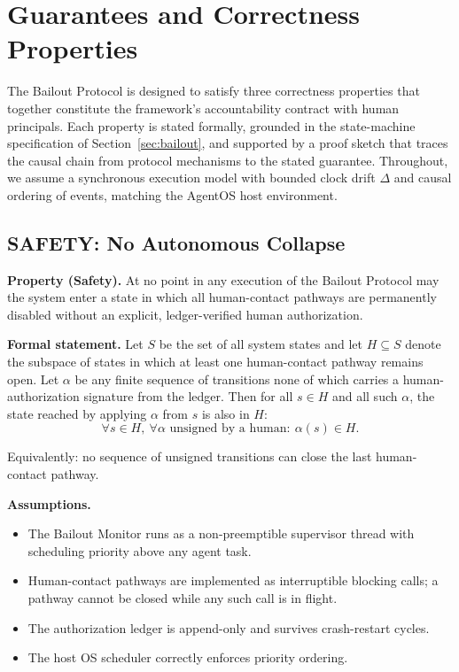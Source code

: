 \section{Guarantees and Correctness Properties}\label{sec:properties}

The Bailout Protocol is designed to satisfy three correctness properties that together constitute the framework's accountability contract with human principals. Each property is stated formally, grounded in the state-machine specification of Section~\ref{sec:bailout}, and supported by a proof sketch that traces the causal chain from protocol mechanisms to the stated guarantee. Throughout, we assume a synchronous execution model with bounded clock drift $\Delta$ and causal ordering of events, matching the AgentOS host environment.

\subsection{SAFETY: No Autonomous Collapse}\label{sec:safety}

\textbf{Property (Safety).} At no point in any execution of the Bailout Protocol may the system enter a state in which all human-contact pathways are permanently disabled without an explicit, ledger-verified human authorization.

\textbf{Formal statement.} Let $S$ be the set of all system states and let $H \subseteq S$ denote the subspace of states in which at least one human-contact pathway remains open. Let $\alpha$ be any finite sequence of transitions none of which carries a human-authorization signature from the ledger. Then for all $s \in H$ and all such $\alpha$, the state reached by applying $\alpha$ from $s$ is also in $H$:
\[
\forall s \in H,\ \forall \alpha \text{ unsigned by a human}: \ \alpha(s) \in H .
\]

Equivalently: no sequence of unsigned transitions can close the last human-contact pathway.

\medskip\noindent\textbf{Assumptions.}
\begin{itemize}\itemsep0em
    \item[(A1)] The Bailout Monitor runs as a non-preemptible supervisor thread with scheduling priority above any agent task.
    \item[(A2)] Human-contact pathways are implemented as interruptible blocking calls; a pathway cannot be closed while any such call is in flight.
    \item[(A3)] The authorization ledger is append-only and survives crash-restart cycles.
    \item[(A4)] The host OS scheduler correctly enforces priority ordering.
\end{itemize}

